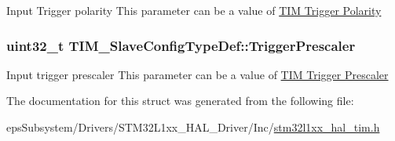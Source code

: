 Input Trigger polarity This parameter can be a value of \hyperlink{group___t_i_m___trigger___polarity}{T\-I\-M Trigger Polarity} \hypertarget{struct_t_i_m___slave_config_type_def_a57be6d41d77a968f1daeac7b65b1ab4c}{
\subsubsection[{Trigger\-Prescaler}]{\setlength{\rightskip}{0pt plus 5cm}uint32\-\_\-t T\-I\-M\-\_\-\-Slave\-Config\-Type\-Def\-::\-Trigger\-Prescaler}}\label{struct_t_i_m___slave_config_type_def_a57be6d41d77a968f1daeac7b65b1ab4c}
Input trigger prescaler This parameter can be a value of \hyperlink{group___t_i_m___trigger___prescaler}{T\-I\-M Trigger Prescaler} 

The documentation for this struct was generated from the following file\-:\begin{DoxyCompactItemize}
\item 
eps\-Subsystem/\-Drivers/\-S\-T\-M32\-L1xx\-\_\-\-H\-A\-L\-\_\-\-Driver/\-Inc/\hyperlink{stm32l1xx__hal__tim_8h}{stm32l1xx\-\_\-hal\-\_\-tim.\-h}\end{DoxyCompactItemize}
